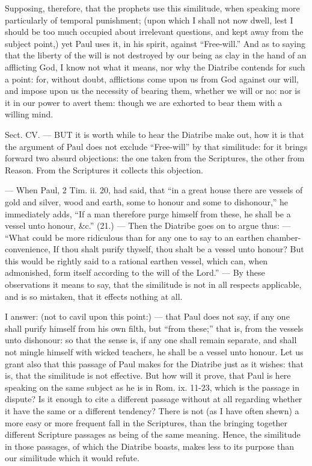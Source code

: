 Supposing, therefore, that the prophets use this similitude, when speaking more particularly of temporal punishment; (upon which I shall not now dwell, lest I should be too much occupied about irrelevant questions, and kept away from the subject point,) yet Paul uses it, in his spirit, against “Free-will.” And as to saying that the liberty of the will is not destroyed by our being as clay in the hand of an afflicting God, I know not what it means, nor why the Diatribe contends for such a point: for, without doubt, afflictions come upon us from God against our will, and impose upon us the necessity of bearing them, whether we will or no: nor is it in our power to avert them: though we are exhorted to bear them with a willing mind.


Sect. CV. — BUT it is worth while to hear the Diatribe make out, how it is that the argument of Paul does not exclude “Free-will” by that similitude: for it brings forward two absurd objections: the one taken from the Scriptures, the other from Reason. From the Scriptures it collects this objection.

— When Paul, 2 Tim. ii. 20, had said, that “in a great house there are vessels of gold and silver, wood and earth, some to honour and some to dishonour,” he immediately adds, “If a man therefore purge himself from these, he shall be a vessel unto honour, \&c.” (21.) — Then the Diatribe goes on to argue thus: — “What could be more ridiculous than for any one to say to an earthen chamber-convenience, If thou shalt purify thyself, thou shalt be a vessel unto honour? But this would be rightly said to a rational earthen vessel, which can, when admonished, form itself according to the will of the Lord.” — By these observations it means to say, that the similitude is not in all respects applicable, and is so mistaken, that it effects nothing at all.

I answer: (not to cavil upon this point:) — that Paul does not say, if any one shall purify himself from his own filth, but “from these;” that is, from the vessels unto dishonour: so that the sense is, if any one shall remain separate, and shall not mingle himself with wicked teachers, he shall be a vessel unto honour. Let us grant also that this passage of Paul makes for the Diatribe just as it wishes: that is, that the similitude is not effective. But how will it prove, that Paul is here speaking on the same subject as he is in Rom. ix. 11-23, which is the passage in dispute? Is it enough to cite a different passage without at all regarding whether it have the same or a different tendency? There is not (as I have often shewn) a more easy or more frequent fall in the Scriptures, than the bringing together different Scripture passages as being of the same meaning. Hence, the similitude in those passages, of which the Diatribe boasts, makes less to its purpose than our similitude which it would refute.

